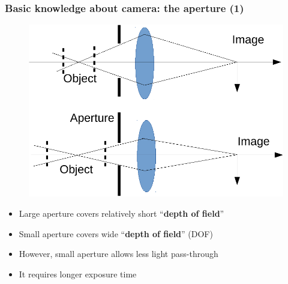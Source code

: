 %

\begin{frame}
 \frametitle{Basic knowledge about camera: the aperture (1)}
\begin{figure}
\begin{center}
	{\includegraphics[width=0.55\linewidth]{./figs/apert3.pdf}}
\end{center}
\end{figure}
\begin{itemize}
	\item {Large aperture covers relatively short ``\textbf{depth of field}''}
	\item {Small aperture covers wide ``\textbf{depth of field}'' (DOF)}
	\item {However, small aperture allows less light pass-through}
	\item {It requires longer exposure time}
\end{itemize}
\end{frame}


